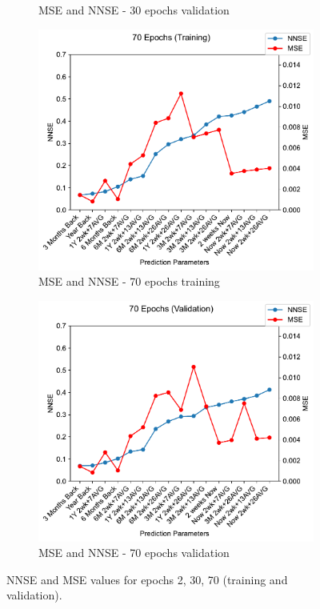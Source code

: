 \documentclass[11pt,twocolumn]{article}
\begin{document}
\begin{figure}[p]
\begin{subfigure}[b]{0.49\textwidth}
        \caption{MSE and NNSE - 30 epochs validation}
        \label{fig:tbd4}
     \end{subfigure}
     \hfill
          \newline
     \hfill
     \begin{subfigure}[b]{0.49\textwidth}
        \centering\includegraphics[width=1.0\linewidth]{images/70_training-MSE-and-NNSE.pdf}
        \caption{MSE and NNSE - 70 epochs training}
        \label{fig:tbd3}
     \end{subfigure}
     \hfill
     \begin{subfigure}[b]{0.49\textwidth}
        \centering\includegraphics[width=1.0\linewidth]{images/70_validation-MSE-and-NNSE.pdf}
        \caption{MSE and NNSE - 70 epochs validation}
        \label{fig:tbd4}
     \end{subfigure}
        \caption{NNSE and MSE values for epochs 2, 30, 70 (training and validation).}
        \label{fig:six graphs}
\end{figure}
\end{document}
